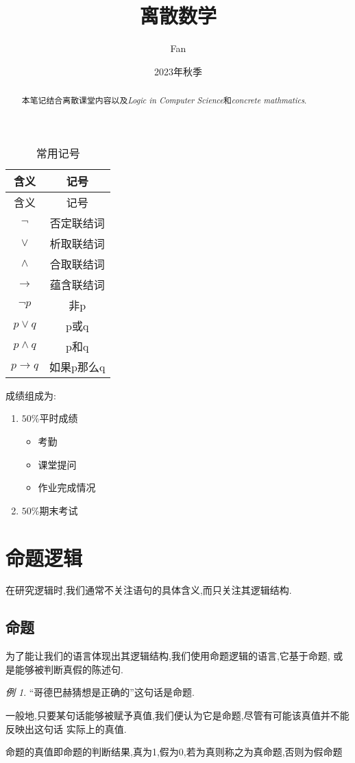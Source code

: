 \documentclass[a4paper,11pt]{article}%
\author{Fan}
\title{离散数学}
\date{2023年秋季}
\theoremstyle{remark}
\theoremstyle{remark}
\newtheorem*{example}{例}
\theoremstyle{definition}
\theoremstyle{definition}
\theoremstyle{plain}
\begin{document}
\maketitle
\tableofcontents
\begin{abstract}
    本笔记结合离散课堂内容以及\emph{Logic in Computer Science}和\emph{concrete mathmatics}.
\end{abstract}
\printindex
\pagestyle{plain}%
\begin{longtable}{cc}
       \caption{常用记号} \\
       \multicolumn{1}{c}{含义}&\multicolumn{1}{c}{记号}\\
       \hline
       \endfirsthead
       \multicolumn{1}{c}{含义}&\multicolumn{1}{c}{记号}\\
       \hline\endhead
       $\lnot$&否定联结词\\
       $\lor$&析取联结词\\
       $\land$&合取联结词\\
       $\rightarrow$&蕴含联结词\\
      $ \lnot p$&非p\\
       $p\lor q$&p或q\\
       $p\land q$&p和q\\
       $p\rightarrow q$&如果p那么q\\
 \end{longtable}
\newpage
成绩组成为:
\begin{enumerate}
    \item $50\%$平时成绩 
    \begin{itemize}
        \item 考勤
        \item 课堂提问
        \item 作业完成情况
    \end{itemize}
    \item $50\%$期末考试
\end{enumerate}
\newpage
\section{命题逻辑}
在研究逻辑时,我们通常不关注语句的具体含义,而只关注其逻辑结构.
\subsection{命题}
为了能让我们的语言体现出其逻辑结构,我们使用命题逻辑的语言,它基于命题,
或是能够被判断真假的陈述句.
\begin{example}
    ``哥德巴赫猜想是正确的''这句话是命题.

    一般地,只要某句话能够被赋予真值,我们便认为它是命题,尽管有可能该真值并不能反映出这句话
    实际上的真值.
\end{example}
命题的真值即命题的判断结果,真为1,假为0,若为真则称之为真命题,否则为假命题
\end{document}
